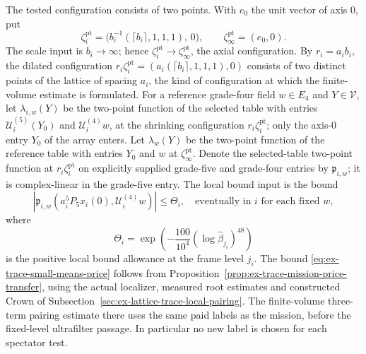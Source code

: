 The tested configuration consists of two points. With $e_0$ the unit vector
of axis $0$, put
\[
 \zeta_i^{\mathrm{pt}}
   =\bigl(b_i^{-1}(\lceil b_i\rceil,1,1,1),\,0\bigr),
 \qquad
 \zeta_\infty^{\mathrm{pt}}=(e_0,0).
\]
The scale input is $b_i\to\infty$; hence
$\zeta_i^{\mathrm{pt}}\to\zeta_\infty^{\mathrm{pt}}$, the axial
configuration. By $r_i=a_ib_i$, the dilated configuration
$r_i\zeta_i^{\mathrm{pt}}=(a_i(\lceil b_i\rceil,1,1,1),0)$ consists of two
distinct points of the lattice of spacing $a_i$, the kind of configuration
at which the finite-volume estimate is formulated.
For a reference grade-four field $w\in E_4$ and $Y\in\mathcal V$, let
$\lambda_{i,w}(Y)$ be the
two-point function of the selected table with entries
$\mathcal U_i^{(5)}(Y_0)$ and
$\mathcal U_i^{(4)}w$, at the shrinking configuration
$r_i\zeta_i^{\mathrm{pt}}$; only the axis-$0$ entry $Y_0$ of the array
enters. Let $\lambda_w(Y)$ be the two-point function of the reference table
with entries $Y_0$ and $w$ at $\zeta_\infty^{\mathrm{pt}}$.
Denote the selected-table two-point function at
$r_i\zeta_i^{\mathrm{pt}}$ on explicitly supplied grade-five and grade-four
entries
by $\mathfrak p_{i,w}$; it is complex-linear in the grade-five entry. The
local bound input is the bound
\begin{equation}
 \left|\mathfrak p_{i,w}
       (a_i^5P_5x_i(0),\mathcal U_i^{(4)}w)\right|
 \leq \Theta_i,
 \quad\text{eventually in }i\text{ for each fixed }w,
 \label{eq:ex-trace-small-means-price}
\end{equation}
where
\[
 \Theta_i=\exp\!\left(-\frac{100}{10^4}
      (\log\widehat\beta_{j_i})^{48}\right)
\]
is the positive local bound allowance
at the frame level $j_i$. The bound
\eqref{eq:ex-trace-small-means-price} follows from
Proposition~\ref{prop:ex-trace-mission-price-transfer}, using the actual
localizer, measured root estimates and constructed Crown of
Subsection~\ref{sec:ex-lattice-trace-local-pairing}. The finite-volume
three-term pairing estimate there uses the same paid labels as the
mission, before the fixed-level ultrafilter passage. In particular no
new label is chosen for each spectator test.

